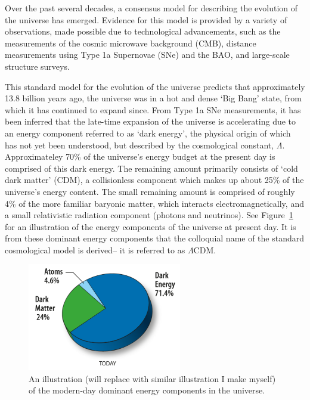 Over the past several decades, a consensus model for describing the evolution of the universe has emerged.  Evidence for this model is provided by a variety of observations, made possible due to technological advancements, such as the measurements of the cosmic microwave background (CMB), distance measurements using Type 1a Supernovae (SNe) and the BAO, and large-scale structure surveys. 

This standard model for the evolution of the universe predicts that approximately 13.8 billion years ago, the universe was in a hot and dense `Big Bang' state, from which it has continued to expand since. From Type 1a SNe measurements, it has been inferred that the late-time expansion of the universe is accelerating due to an energy component referred to as `dark energy', the physical origin of which has not yet been understood, but described by the cosmological constant, $\Lambda$. Approximateley 70\% of the universe's energy budget at the present day is comprised of this dark energy. The remaining amount primarily consists of `cold dark matter' (CDM), a collisionless component which makes up about 25\% of the universe's energy content. The small remaining amount is comprised of roughly 4\% of the more familiar baryonic matter, which interacts electromagnetically, and a small relativistic radiation component (photons and neutrinos). See Figure~\ref{fig:contentuniverse} for an illustration of the energy components of the universe at present day. It is from these dominant energy components that the colloquial name of the standard cosmological model is derived-- it is referred to as $\Lambda$CDM.
\begin{figure}[ht]
	\centering
	\includegraphics[width=0.6\textwidth]{fig/placeholer_energycontent_wmap.png}
	\caption{An illustration (will replace with similar illustration I make myself) of the modern-day dominant energy components in the universe.}
	\label{fig:contentuniverse}
\end{figure}

